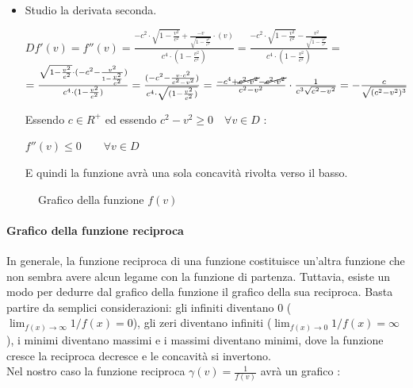 \documentclass[a4paper,12pt]{report}
\begin{document}
\begin{itemize}
\item Studio la derivata seconda. 
\begin{center}
$Df'(v) = f''(v) = \frac{-c^2 \cdot \sqrt{1 - \frac{v^2}{c^2}} + \frac{-v}{\sqrt{1 - \frac{v^2}{c^2}}} \cdot (v)}{c^4 \cdot (1- \frac{v^2}{c^2})}    =     \frac{-c^2 \cdot \sqrt{1 - \frac{v^2}{c^2}} - \frac{v^2}{\sqrt{1 - \frac{v^2}{c^2}}}}{c^4 \cdot (1- \frac{v^2}{c^2})} =$ \\
\medskip
$= \frac{\sqrt{1 - \frac{v^2}{c^2}} \cdot (-c^2 - \frac{v^2}{1- \frac{v^2}{c^2}})}{c^4 \cdot (1- \frac{v^2}{c^2})} = \frac{(-c^2 - \frac{v \cdot c^2}{c^2 -v^2})}{c^4 \cdot \sqrt{(1- \frac{v^2}{c^2})}} = \frac{-c^4 + \cancel{c^2 \cdot v^2} - \cancel{c^2 \cdot v^2}}{c^2 - v^2} \cdot \frac{1}{c^3 \sqrt{c^2 - v^2}} = -\frac{c}{\sqrt{(c^2 - v^2)^3}}$ 
\end{center} 
Essendo $c \in R^+$ ed essendo $c^2 -v^2 \geq 0 \quad \forall v \in D$ : \\
\begin{center}
$f''(v) \leq 0 \qquad \forall v \in D$
\end{center}
E quindi la funzione avrà una sola concavità rivolta verso il basso.

\end{itemize}

\begin{figure}[!h]
\begin{center}
	\caption{Grafico della funzione $f(v)$}
\end{center}
\end{figure}
\newpage

\paragraph{Grafico della funzione reciproca}
In generale, la funzione reciproca di una funzione costituisce un’altra funzione che non sembra avere alcun legame con la funzione di partenza. Tuttavia, esiste un modo per dedurre dal grafico della funzione il grafico della sua reciproca. Basta partire da semplici considerazioni: gli infiniti diventano 0 ($\lim_{f(x) \to \infty}1/f(x) = 0$), gli zeri diventano infiniti ($\lim_{f(x) \to 0}1/f(x) = \infty$), i minimi diventano massimi e i massimi diventano minimi, dove la funzione cresce la reciproca decresce e le concavità si invertono.\\ Nel nostro caso la funzione reciproca $\gamma(v) = \frac{1}{f(v)}$ avrà un grafico :
\end{document}
